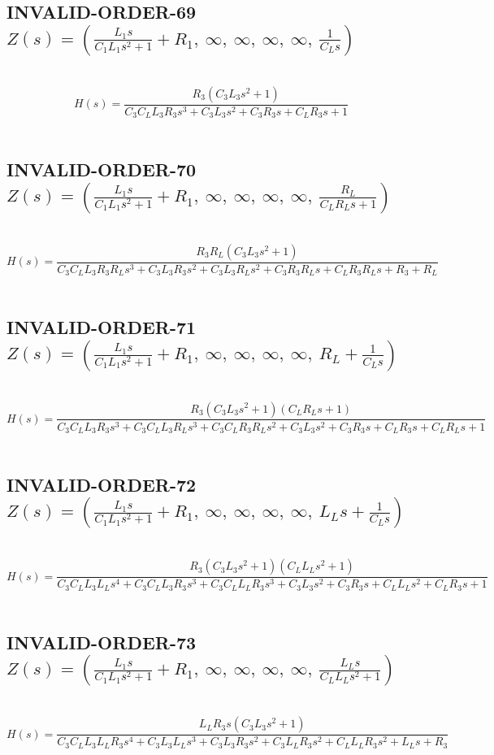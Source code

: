 \documentclass{article}
\begin{document}
\subsection{INVALID-ORDER-69 $Z(s) = \left( \frac{L_{1} s}{C_{1} L_{1} s^{2} + 1} + R_{1}, \  \infty, \  \infty, \  \infty, \  \infty, \  \frac{1}{C_{L} s}\right)$ } \ 
\textbf{\[H(s) = \frac{R_{3} \left(C_{3} L_{3} s^{2} + 1\right)}{C_{3} C_{L} L_{3} R_{3} s^{3} + C_{3} L_{3} s^{2} + C_{3} R_{3} s + C_{L} R_{3} s + 1}\] } \ 
\subsection{INVALID-ORDER-70 $Z(s) = \left( \frac{L_{1} s}{C_{1} L_{1} s^{2} + 1} + R_{1}, \  \infty, \  \infty, \  \infty, \  \infty, \  \frac{R_{L}}{C_{L} R_{L} s + 1}\right)$ } \ 
\textbf{\[H(s) = \frac{R_{3} R_{L} \left(C_{3} L_{3} s^{2} + 1\right)}{C_{3} C_{L} L_{3} R_{3} R_{L} s^{3} + C_{3} L_{3} R_{3} s^{2} + C_{3} L_{3} R_{L} s^{2} + C_{3} R_{3} R_{L} s + C_{L} R_{3} R_{L} s + R_{3} + R_{L}}\] } \ 
\subsection{INVALID-ORDER-71 $Z(s) = \left( \frac{L_{1} s}{C_{1} L_{1} s^{2} + 1} + R_{1}, \  \infty, \  \infty, \  \infty, \  \infty, \  R_{L} + \frac{1}{C_{L} s}\right)$ } \ 
\textbf{\[H(s) = \frac{R_{3} \left(C_{3} L_{3} s^{2} + 1\right) \left(C_{L} R_{L} s + 1\right)}{C_{3} C_{L} L_{3} R_{3} s^{3} + C_{3} C_{L} L_{3} R_{L} s^{3} + C_{3} C_{L} R_{3} R_{L} s^{2} + C_{3} L_{3} s^{2} + C_{3} R_{3} s + C_{L} R_{3} s + C_{L} R_{L} s + 1}\] } \ 
\subsection{INVALID-ORDER-72 $Z(s) = \left( \frac{L_{1} s}{C_{1} L_{1} s^{2} + 1} + R_{1}, \  \infty, \  \infty, \  \infty, \  \infty, \  L_{L} s + \frac{1}{C_{L} s}\right)$ } \ 
\textbf{\[H(s) = \frac{R_{3} \left(C_{3} L_{3} s^{2} + 1\right) \left(C_{L} L_{L} s^{2} + 1\right)}{C_{3} C_{L} L_{3} L_{L} s^{4} + C_{3} C_{L} L_{3} R_{3} s^{3} + C_{3} C_{L} L_{L} R_{3} s^{3} + C_{3} L_{3} s^{2} + C_{3} R_{3} s + C_{L} L_{L} s^{2} + C_{L} R_{3} s + 1}\] } \ 
\subsection{INVALID-ORDER-73 $Z(s) = \left( \frac{L_{1} s}{C_{1} L_{1} s^{2} + 1} + R_{1}, \  \infty, \  \infty, \  \infty, \  \infty, \  \frac{L_{L} s}{C_{L} L_{L} s^{2} + 1}\right)$ } \ 
\textbf{\[H(s) = \frac{L_{L} R_{3} s \left(C_{3} L_{3} s^{2} + 1\right)}{C_{3} C_{L} L_{3} L_{L} R_{3} s^{4} + C_{3} L_{3} L_{L} s^{3} + C_{3} L_{3} R_{3} s^{2} + C_{3} L_{L} R_{3} s^{2} + C_{L} L_{L} R_{3} s^{2} + L_{L} s + R_{3}}\] } \ 
\end{document}
